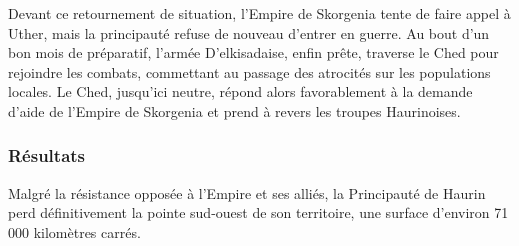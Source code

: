 \documentclass[french, a4paper, 12pt]{article}
\begin{document}
		Devant ce retournement de situation, l'Empire de Skorgenia tente de faire appel à Uther, mais la principauté refuse de nouveau d'entrer en guerre. Au bout d'un bon mois de préparatif, l'armée D'elkisadaise, enfin prête, traverse le Ched pour rejoindre les combats, commettant au passage des atrocités sur les populations locales. Le Ched, jusqu'ici neutre, répond alors favorablement à la demande d'aide de l'Empire de Skorgenia et prend à revers les troupes Haurinoises.

		\subsubsection{Résultats}

		Malgré la résistance opposée à l'Empire et ses alliés, la Principauté de Haurin perd définitivement la pointe sud-ouest de son territoire, une surface d'environ 71 000 kilomètres carrés. 
\end{document}
